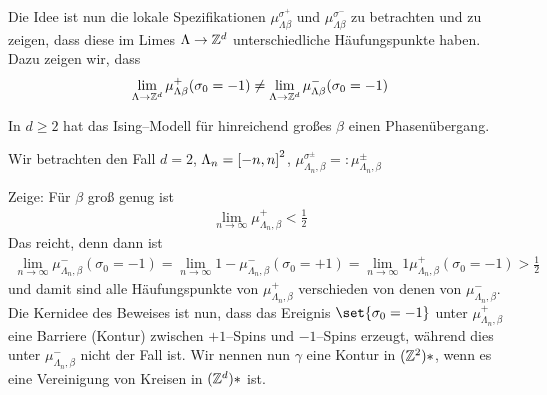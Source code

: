 Die Idee ist nun die lokale Spezifikationen $\mu_{\Lambda\beta}^{\sigma^+}$ und $\mu_{\Lambda\beta}^{\sigma^-}$ zu betrachten und zu zeigen, dass diese im Limes $\Lambda \to \mathbb{Z}^d$ unterschiedliche Häufungspunkte haben. Dazu zeigen wir, dass 
\begin{align}
	\lim\limits_{\Lambda \to \mathbb{Z}^d} \mu_{\Lambda \beta}^+ (\sigma_0 = -1) \neq \lim\limits_{\Lambda \to \mathbb{Z}^d} \mu_{\Lambda \beta}^- (\sigma_0 = -1) 
\end{align}
\begin{satz}[Peierls 1936]
	In $d \geq 2$ hat das Ising--Modell für hinreichend großes $\beta$ einen Phasenübergang. 
\end{satz}
\begin{beweis}
	Wir betrachten den Fall $d=2$, $\Lambda_n = \left\lbrack-n,n\right\rbrack^2$, $\mu_{\Lambda_n, \beta}^{\sigma^{\pm}} =: \mu_{\Lambda_n, \beta}^{\pm}$
	
	Zeige: Für $\beta$ groß genug ist 
	\begin{align}
		\lim\limits_{n \to \infty }\mu_{\Lambda_n, \beta}^{+} < \frac{1}{2}
	\end{align}
	Das reicht, denn dann ist
	\begin{align}
		\lim\limits_{n \to \infty} \mu_{\Lambda_n, \beta}^{-} (\sigma_0 = -1) = \lim\limits_{n \to \infty} 1 - \mu_{\Lambda_n, \beta}^{-} (\sigma_0 = +1) = \lim\limits_{n \to \infty} 1 \mu_{\Lambda_n, \beta}^{+} (\sigma_0  = -1) > \frac{1}{2}
	\end{align}
	und damit sind alle Häufungspunkte von $\mu_{\Lambda_n, \beta}^{+}$ verschieden von denen von $\mu_{\Lambda_n, \beta}^{-}$.
	Die Kernidee des Beweises ist nun, dass das Ereignis $\set{\sigma_0 = -1}$ unter $\mu_{\Lambda_n, \beta}^{+}$ eine Barriere (Kontur) zwischen $+1$--Spins und $-1$--Spins erzeugt, während dies unter $\mu_{\Lambda_n, \beta}^{-}$ nicht der Fall ist. Wir nennen nun $\gamma$ eine Kontur in $(\mathbb{Z}^2)*$, wenn es eine Vereinigung von Kreisen in $(\mathbb{Z}^d)*$ ist. 
	

\end{beweis}
